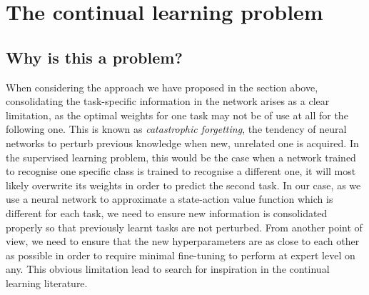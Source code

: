 \documentclass{article}
\begin{document}
\section{The continual learning problem}
\subsection{Why is this a problem?}
When considering the approach we have proposed in the section above, consolidating the task-specific information in the network arises as a clear limitation, as the optimal weights for one task may not be of use at all for the following one. This is known as \textit{catastrophic forgetting}, the tendency of neural networks to perturb previous knowledge when new, unrelated one is acquired. In the supervised learning problem, this would be the case when a network trained to recognise one specific class is trained to recognise a different one, it will most likely overwrite its weights in order to predict the second task. In our case, as we use a neural network to approximate a state-action value function which is different for each task, we need to ensure new information is consolidated properly so that previously learnt tasks are not perturbed. From another point of view, we need to ensure that the new hyperparameters are as close to each other as possible in order to require minimal fine-tuning to perform at expert level on any. This obvious limitation lead to search for inspiration in the continual learning literature.
\end{document}
